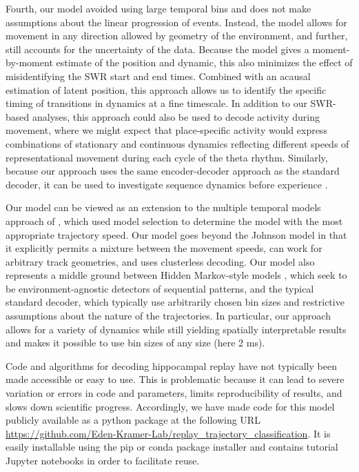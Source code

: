 \documentclass[9pt,lineno]{elife}
\begin{document}
Fourth, our model avoided using large temporal bins and does not make assumptions about the linear progression of events. Instead, the model allows for movement in any direction allowed by geometry of the environment, and further, still accounts for the uncertainty of the data. Because the model gives a moment-by-moment estimate of the position and dynamic, this also minimizes the effect of misidentifying the SWR start and end times. Combined with an acausal estimation of latent position, this approach allows us to identify the specific timing of transitions in dynamics at a fine timescale. In addition to our SWR-based analyses, this approach could also be used to decode activity during movement, where we might expect that place-specific activity would express combinations of stationary and continuous dynamics reflecting different speeds of representational movement during each cycle of the theta rhythm. Similarly, because our approach uses the same encoder-decoder approach as the standard decoder, it can be used to investigate sequence dynamics before experience \cite{}.

Our model can be viewed as an extension to the multiple temporal models approach of \cite{JohnsonMeasuringdistributedproperties2008}, which used model selection to determine the model with the most appropriate trajectory speed. Our model goes beyond the Johnson model in that it explicitly permits a mixture between the movement speeds, can work for arbitrary track geometries, and uses clusterless decoding. Our model also represents a middle ground between Hidden Markov-style models \citep{MaboudiUncoveringtemporalstructure2018, ChenBayesiannonparametricmethods2016, LindermanBayesiannonparametricapproach2016, ChenUncoveringspatialtopology2012}, which seek to be environment-agnostic detectors of sequential patterns, and the typical standard decoder, which typically use arbitrarily chosen bin sizes and restrictive assumptions about the nature of the trajectories. In particular, our approach allows for a variety of dynamics while still yielding spatially interpretable results and makes it possible to use bin sizes of any size (here 2 ms).

Code and algorithms for decoding hippocampal replay have not typically been made accessible or easy to use. This is problematic because it can lead to severe variation or errors in code and parameters, limits reproducibility of results, and slows down scientific progress. Accordingly, we have made code for this model publicly available as a python package at the following URL \url{https://github.com/Eden-Kramer-Lab/replay_trajectory_classification}. It is easily installable using the pip or conda package installer and contains tutorial Jupyter notebooks in order to facilitate reuse.
\end{document}

